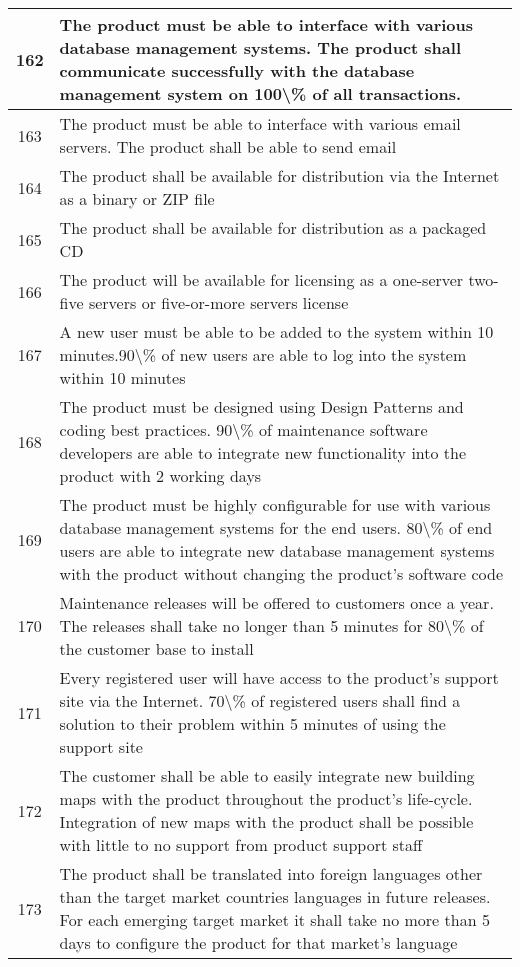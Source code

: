 \begin{table}
{\begin{tabularx}{\textwidth}{cX}
    162   & The product must be able to interface with various database management systems. The product shall communicate successfully with the database management system on 100\textbackslash{}\% of all transactions. \\    \midrule
    163   & The product must be able to interface with various email servers. The product shall be able to send email \\    \midrule
    164   & The product shall be available for distribution via the Internet as a binary or ZIP file \\    \midrule
    165   & The product shall be available for distribution as a packaged CD \\    \midrule
    166   & The product will be available for licensing as a one-server two-five servers or five-or-more servers license \\    \midrule
    167   & A new user must be able to be added to the system within 10 minutes.90\textbackslash{}\% of new users are able to log into the system within 10 minutes \\    \midrule
    168   & The product must be designed using Design Patterns and coding best practices. 90\textbackslash{}\% of maintenance software developers are able to integrate new functionality into the product with 2 working days \\    \midrule
    169   & The product must be highly configurable for use with various database management systems for the end users. 80\textbackslash{}\% of end users are able to integrate new database management systems with the product without changing the product's software code \\    \midrule
    170   & Maintenance releases will be offered to customers once a year. The releases shall take no longer than 5 minutes for 80\textbackslash{}\% of the customer base to install \\    \midrule
    171   & Every registered user will have access to the product's support site via the Internet. 70\textbackslash{}\% of registered users shall find a solution to their problem within 5 minutes of using the support site \\    \midrule
    172   & The customer shall be able to easily integrate new building maps with the product throughout the product's life-cycle. Integration of new maps with the product shall be possible with little to no support from product support staff \\    \midrule
    173   & The product shall be translated into foreign languages other than the target market countries languages in future releases. For each emerging target market it shall take no more than 5 days to configure the product for that market's language \\    \midrule

\end{tabularx}}
\end{table}
